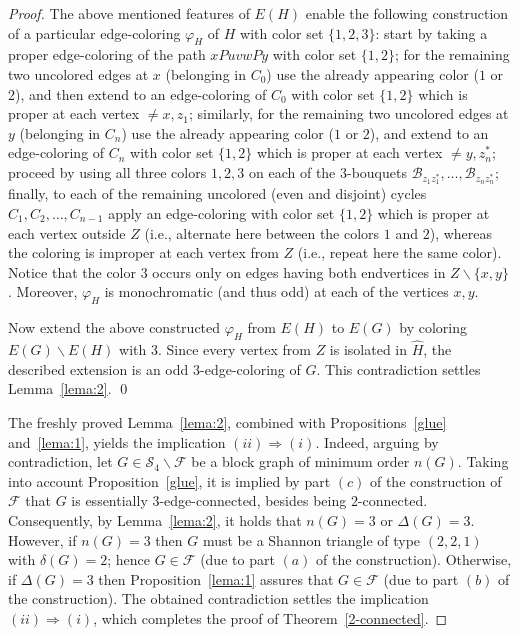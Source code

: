 \documentclass[a4paper,12pt]{article}
\numberwithin{equation}{section}
\begin{document}
\begin{proof}
The above mentioned features of $E(H)$ enable the following construction of a particular edge-coloring $\varphi_H$ of $H$ with color set $\{1,2,3\}$: start by taking a proper edge-coloring of the path $xPuvwPy$ with color set $\{1,2\}$; for the remaining two uncolored edges at $x$ (belonging in $C_0$) use the already appearing color ($1$ or $2$), and then extend to an edge-coloring of $C_0$ with color set $\{1,2\}$ which is proper at each vertex $\neq x,z_1$; similarly,  for the remaining two uncolored edges at $y$ (belonging in $C_n$) use the already appearing color ($1$ or $2$), and extend to an edge-coloring of $C_n$ with color set $\{1,2\}$ which is proper at each vertex $\neq y,z_n^*$; proceed by using all three colors $1,2,3$ on each of the $3$-bouquets $\mathcal{B}_{z_1z_1^*},\ldots,\mathcal{B}_{z_nz_n^*}$; finally, to each of the remaining uncolored (even and disjoint) cycles $C_1,C_2,\ldots,C_{n-1}$ apply an  edge-coloring with color set $\{1,2\}$ which is proper at each vertex outside $Z$ (i.e., alternate here between the colors $1$ and $2$), whereas the coloring is improper at each vertex from $Z$ (i.e., repeat here the same color). Notice that the color $3$ occurs only on edges having both endvertices in $Z\backslash\{x,y\}$. Moreover, $\varphi_H$ is monochromatic (and thus odd) at each of the vertices $x,y$.

Now extend the above constructed $\varphi_H$ from $E(H)$ to $E(G)$ by coloring $E(G)\backslash E(H)$ with $3$. Since every vertex from $Z$ is isolated in $\widehat{H}$, the described extension is an odd $3$-edge-coloring of $G$. This contradiction settles Lemma~\ref{lema:2}. \qed

\medskip

The freshly proved Lemma~\ref{lema:2}, combined with Propositions~\ref{glue} and~\ref{lema:1}, yields the implication $(ii)\Rightarrow (i)$. Indeed, arguing by contradiction, let $G\in\mathcal{S}_4\backslash \mathcal{F}$ be a block graph of minimum order $n(G)$. Taking into account Proposition~\ref{glue}, it is implied by part $(c)$ of the construction of $\mathcal{F}$ that $G$ is essentially $3$-edge-connected, besides being $2$-connected. Consequently, by Lemma~\ref{lema:2}, it holds that $n(G)=3$ or $\Delta(G)=3$. However, if $n(G)=3$ then $G$ must be a Shannon triangle of type $(2,2,1)$ with $\delta(G)=2$; hence $G\in \mathcal{F}$ (due to part $(a)$ of the construction). Otherwise, if $\Delta(G)=3$ then Proposition~\ref{lema:1} assures that $G\in\mathcal{F}$ (due to part $(b)$ of the construction). The obtained contradiction settles the implication $(ii)\Rightarrow (i)$, which completes the proof of Theorem~\ref{2-connected}.
\end{proof}
\end{document}
